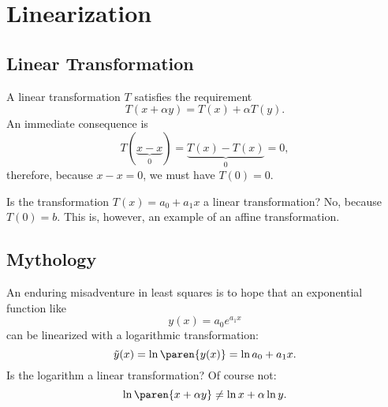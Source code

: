 \chapter{Linearization}

\section{Linear Transformation}  %

A linear transformation $T$ satisfies the requirement
  \begin{equation*}   %
    T(x + \alpha y) = T(x) + \alpha T(y).
    \label{eq:defn lt}
  \end{equation*}
An immediate consequence is
  \begin{equation*}   %
    T(\underbrace{x - x}_{0}) = \underbrace{T(x) - T(x)}_{0} = 0,
  \end{equation*}
therefore, because $x-x=0$, we must have $T(0) = 0$.

Is the transformation $T(x) = a_{0} + a_{1} x$ a linear transformation? No, because $T(0) = b$. This is, however, an example of an affine transformation.

\section{Mythology}  %

An enduring misadventure in least squares is to hope that an exponential function like
  \begin{equation*}   %
    y(x) = a_{0} e^{a_{1}x}
  \end{equation*}
can be linearized with a logarithmic transformation:
  \begin{equation*}   %
    \tilde{y}(x) = \ln \paren{y(x)} = \ln a_{0} + a_{1} x.
  \end{equation*}
Is the logarithm a linear transformation? Of course not:
  \begin{equation*}   %
    \ln \paren{x + \alpha y} \ne \ln x + \alpha \ln y.
  \end{equation*}

\endinput